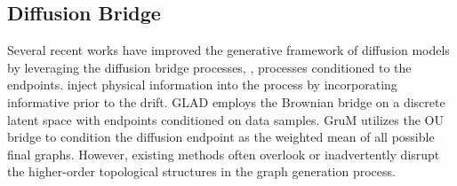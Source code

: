 \subsection{Diffusion Bridge} 
Several recent works have improved the generative framework of diffusion models by leveraging the diffusion bridge processes, \ie, processes conditioned to the endpoints.
%
\citet{wu2022diffusion} inject physical information into the process by incorporating informative prior to the drift.
% 
GLAD \cite{GLAD-ICMLworkshop2024} employs the Brownian bridge on a discrete latent space with endpoints conditioned on data samples.
%
GruM \cite{GruM+ICML2024} utilizes the OU bridge to condition the diffusion endpoint as the weighted mean of all possible final graphs.
%
However, existing methods often overlook or inadvertently disrupt the higher-order topological structures in the graph generation process.

